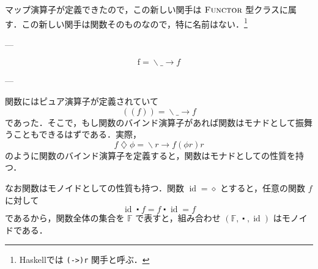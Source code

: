 \documentclass[a4paper,twocolumn]{jsbook}
\def\({\left(\!\left(}
\def\){\right)\!\right)}
\newcommand{\programminglanguage}[1]{\textsf{#1}}
\newcommand{\haskell}{\programminglanguage{Haskell}}
\newcommand{\code}[1]{\texttt{#1}}
\newcommand{\mConst}[1]{\mathrm{#1}}
\newcommand{\mAnonParam}{\diamond}
\newcommand{\mAnyParam}{\_}
\DeclareMathOperator{\mConst}{const}
\DeclareMathOperator{\mId}{id}
\DeclareMathOperator{\mAppMap}{\times}
\DeclareMathOperator{\mAppMapFunc}{\bowtie}
\DeclareMathOperator{\mBindFunc}{\diamondsuit}
\DeclareMathOperator{\mComp}{\centerdot}
\DeclareMathOperator{\mIn}{{:\!:}}
\DeclareMathOperator{\mLambda}{\backslash}
\DeclareMathOperator{\mLambdaArrow}{\rightarrow}
\DeclareMathOperator{\mMap}{\bullet}
\DeclareMathOperator{\mMapFunc}{\circ}
\DeclareMathOperator{\mMapsTo}{\mapsto}
\newcommand{\mSpecialSet}[1]{\mathbb{#1}} %
\newcommand{\mFSet}{\mSpecialSet{F}}
\newcommand{\mType}[1]{\mathbf{#1}}
\newcommand{\mFuncWith}[1]{\(#1\)}
\newcommand{\mPureWith}[1]{\langle#1\rangle}
\newcommand{\mTupleWith}[1]{\left(#1\right)}
\newcommand{\mFuncType}[1]{\(\mType{#1}\)_\mType{r}}
\newcommand{\mSpecialTypeClass}[1]{\textsc{#1}} %
\newcommand{\mFunctorTypeClass}{\mSpecialTypeClass{Functor}}
\newcommand{\mLambdaExp}[2]{\mLambda{#1}\mLambdaArrow{#2}}
\newcommand{\mProj}[2]{#1\mMapsTo#2}
\begin{document}
マップ演算子が定義できたので，この新しい関手は $\mFunctorTypeClass$ 型クラスに属す．この新しい関手は関数そのものなので，特に名前はない．\footnote{\haskell では \code{(->)r} 関手と呼ぶ．}



---

$$\mConst f=\mLambdaExp{\mAnyParam}{f}$$

---

関数にはピュア演算子が定義されていて
\begin{equation}
\mFuncWith{f}=\mLambdaExp{\mAnyParam}{f}
\end{equation}
であった．そこで，もし関数のバインド演算子があれば関数はモナドとして振舞うこともできるはずである．実際，
\begin{equation}
f\mBindFunc\phi=\mLambdaExp{r}{f(\phi r)r}
\end{equation}
のように関数のバインド演算子を定義すると，関数はモナドとしての性質を持つ．

なお関数はモノイドとしての性質も持つ．関数 $\mId=\mAnonParam$ とすると，任意の関数 $f$ に対して
\begin{equation}
\mId\mComp f=f\mComp\mId=f
\end{equation}
であるから，関数全体の集合を $\mFSet$ で表すと，組み合わせ $\mTupleWith{\mFSet,\mComp,\mId}$ はモノイドである．
\end{document}

